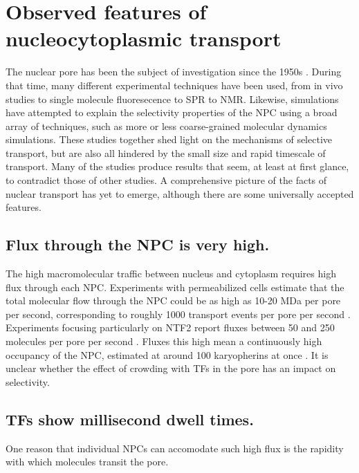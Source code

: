 \section{Observed features of nucleocytoplasmic transport} 
The nuclear pore has been the subject of investigation since the 1950s \cite{hapensomething16 or another review article with timeline}.  During that time, many different experimental techniques have been used, from in vivo studies to single molecule fluoresecence to SPR to NMR.  Likewise, simulations have attempted to explain the selectivity properties of the NPC using a broad array of techniques, such as more or less coarse-grained molecular dynamics simulations.  These studies together shed light on the mechanisms of selective transport, but are also all hindered by the small size and rapid timescale of transport.  Many of the studies produce results that seem, at least at first glance, to contradict those of other studies.  A comprehensive picture of the facts of nuclear transport has yet to emerge, although there are some universally accepted features.
\subsection{Flux through the NPC is very high.}
The high macromolecular traffic between nucleus and cytoplasm requires high flux through each NPC.  Experiments with permeabilized cells estimate that the total molecular flow through the NPC could be as high as 10-20 MDa per pore per second, corresponding to roughly 1000 transport events per pore per second \cite{ribbeck01}.  Experiments focusing particularly on NTF2 report fluxes between 50 and 250 molecules per pore per second \cite{ribbeck01, siebrasse02, kiskin03}.  Fluxes this high mean a continuously high occupancy of the NPC, estimated at around 100 karyopherins at once \cite{paradise07}.  It is unclear whether the effect of crowding with TFs in the pore has an impact on selectivity.

\subsection{TFs show millisecond dwell times.}
One reason that individual NPCs can accomodate such high flux is the rapidity with which molecules transit the pore.  

